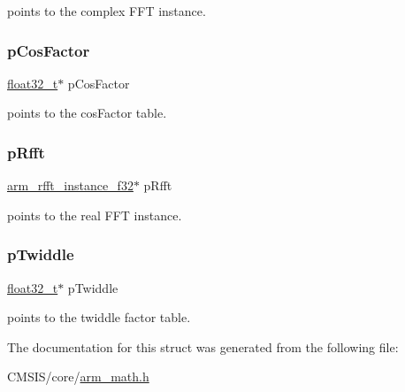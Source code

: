 points to the complex F\+FT instance. \mbox{\label{structarm__dct4__instance__f32_abd73b9d7fb4951ba086e4820c2a48eb0}} 
\subsubsection{\texorpdfstring{pCosFactor}{pCosFactor}}
{\footnotesize\ttfamily \mbox{\hyperlink{arm__math_8h_a4611b605e45ab401f02cab15c5e38715}{float32\+\_\+t}}$\ast$ p\+Cos\+Factor}

points to the cos\+Factor table. \mbox{\label{structarm__dct4__instance__f32_ad4cd7c85eea3f7c5fff4630bbd979e6a}} 
\subsubsection{\texorpdfstring{pRfft}{pRfft}}
{\footnotesize\ttfamily \mbox{\hyperlink{structarm__rfft__instance__f32}{arm\+\_\+rfft\+\_\+instance\+\_\+f32}}$\ast$ p\+Rfft}

points to the real F\+FT instance. \mbox{\label{structarm__dct4__instance__f32_aca581481fccdff0f557f54a3ef20d967}} 
\subsubsection{\texorpdfstring{pTwiddle}{pTwiddle}}
{\footnotesize\ttfamily \mbox{\hyperlink{arm__math_8h_a4611b605e45ab401f02cab15c5e38715}{float32\+\_\+t}}$\ast$ p\+Twiddle}

points to the twiddle factor table. 

The documentation for this struct was generated from the following file\+:\begin{DoxyCompactItemize}
\item 
C\+M\+S\+I\+S/core/\mbox{\hyperlink{arm__math_8h}{arm\+\_\+math.\+h}}\end{DoxyCompactItemize}
